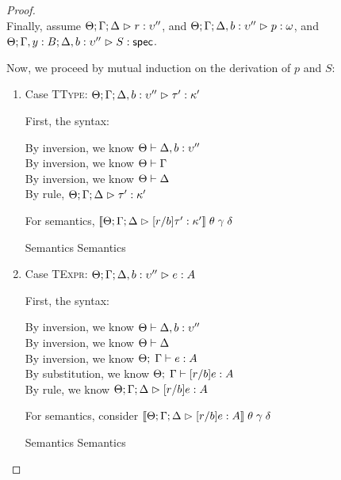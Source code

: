 \begin{proof}
\ \\

Finally, assume $\judgeA{r}{\upsilon''}$, and $\judgeA[\Theta; \Gamma;\Delta, b:\upsilon'']{p}{\omega}$, and
$\judgeS[\Theta; \Gamma, y:B; \Delta, b:\upsilon'']{S}$. 

Now, we proceed by mutual induction on the derivation of $p$ and $S$: 
\begin{enumerate}

\item Case \textsc{TType}: $\judgeA[\Theta; \Gamma; \Delta, b:\upsilon'']{\tau'}{\kappa'}$

  First, the syntax:
  \begin{tabbedproof}
    \oo By inversion, we know $\judgectx{\Theta}{\Delta, b:\upsilon''}$ \\
    \oo By inversion, we know $\judgectx{\Theta}{\Gamma}$ \\
    \oo By inversion, we know $\judgectx{\Theta}{\Delta}$ \\
    \oo By rule, $\judgeA[\Theta; \Gamma;\Delta]{\tau'}{\kappa'}$
  \end{tabbedproof}

  For semantics,  $\interp{\judgeA[\Theta; \Gamma; \Delta]{[r/b]\tau'}{\kappa'}}\;\theta\;\gamma\;\delta$
  \begin{eqnproof}
          {Semantics}
          {Semantics}
  \end{eqnproof}

  \item Case \textsc{TExpr}: $\judgeA[\Theta; \Gamma; \Delta, b:\upsilon'']{e}{A}$

    First, the syntax:
    \begin{tabbedproof}
      \oo By inversion, we know $\judgectx{\Theta}{\Delta, b:\upsilon''}$ \\
      \oo By inversion, we know $\judgectx{\Theta}{\Delta}$ \\
      \oo By inversion, we know $\judgeE{\Gamma}{e}{A}$ \\
      \oo By substitution, we know $\judgeE{\Gamma}{[r/b]e}{A}$ \\
      \oo By rule, we know $\judgeA[\Theta; \Gamma; \Delta]{[r/b]e}{A}$
    \end{tabbedproof}

    For semantics, consider $\interp{\judgeA[\Theta; \Gamma; \Delta]{[r/b]e}{A}}\;\theta\;\gamma\;\delta$
    \begin{eqnproof}
            {Semantics}
            {Semantics}
    \end{eqnproof}


\end{enumerate}
\end{proof}

